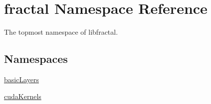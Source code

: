 \hypertarget{namespacefractal}{\section{fractal Namespace Reference}
\label{namespacefractal}
}


The topmost namespace of libfractal.  


\subsection*{Namespaces}
\begin{DoxyCompactItemize}
\item 
 \hyperlink{namespacefractal_1_1basicLayers}{basic\+Layers}
\item 
 \hyperlink{namespacefractal_1_1cudaKernels}{cuda\+Kernels}
\end{DoxyCompactItemize}
